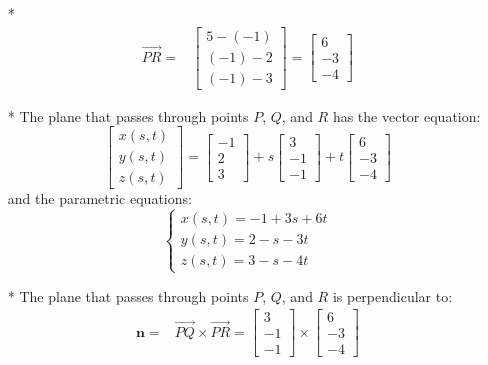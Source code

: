 \documentclass{article}
\begin{document}
\begin{itemize}
\item[*] \begin{align*}
\overrightarrow{PR} = & \begin{bmatrix} 5 - (-1) \\ (-1) - 2 \\ (-1) - 3 \end{bmatrix} = \begin{bmatrix} 6 \\ -3 \\ -4 \end{bmatrix}
\end{align*}
\item[*] The plane that passes through points \(P\), \(Q\), and \(R\) has the vector equation:
\[\begin{bmatrix} x(s, t) \\ y(s, t) \\ z(s, t) \end{bmatrix} = \begin{bmatrix} -1 \\ 2 \\ 3 \end{bmatrix} + s\begin{bmatrix} 3 \\ -1 \\ -1 \end{bmatrix} + t\begin{bmatrix} 6 \\ -3 \\ -4 \end{bmatrix}\] 
and the parametric equations: 
\[\left\{\begin{array}{c} 
x(s, t) = -1 + 3s + 6t \\ 
y(s, t) = 2 - s - 3t \\ 
z(s, t) = 3 - s - 4t 
\end{array}\right.\]
\item[*] The plane that passes through points \(P\), \(Q\), and \(R\) is perpendicular to:
\begin{align*}
\mathbf{n} = & \overrightarrow{PQ} \times \overrightarrow{PR} 
= \begin{bmatrix} 3 \\ -1 \\ -1 \end{bmatrix} \times \begin{bmatrix} 6 \\ -3 \\ -4 \end{bmatrix} 

\end{align*}
\end{itemize}
\end{document}
